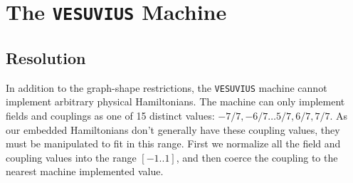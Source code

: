 \chapter{The \texttt{VESUVIUS} Machine}

\section{Resolution}
In addition to the graph-shape restrictions, the \texttt{VESUVIUS} machine cannot implement arbitrary physical Hamiltonians.  The machine can only implement fields and couplings as one of 15 distinct values: $-7/7, -6/7 \dots 5/7,6/7, 7/7$.  As our embedded Hamiltonians don't generally have these coupling values, they must be manipulated to fit in this range.
First we normalize all the field and coupling values into the range $[-1..1]$, and then coerce the coupling to the nearest machine implemented value.
